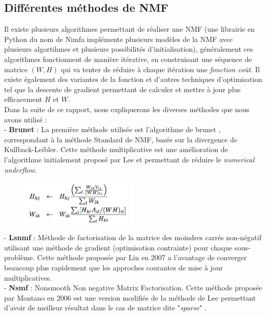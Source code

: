 \documentclass[runningheads]{llncs}
\begin{document}
\subsection{Différentes méthodes de NMF}

Il existe plusieurs algorithmes permettant de réaliser une NMF (une librairie en Python du nom de Nimfa \cite{Zitnik2012} implémente plusieurs modèles de la NMF avec plusieurs algortihmes et plusieurs possibilités d'initialisation), généralement ces algorithmes fonctionnent de manière itérative, en construisant une séquence de matrice $(W, H)$ qui va tenter de réduire à chaque itération une \textit{fonction coût}. Il existe également des variantes de la fonction et d'autres techniques d'optimisation tel que la descente de gradient permettant de calculer et mettre à jour plus efficacement $H$ et $W$. \\
Dans la suite de ce rapport, nous expliquerons les diverses méthodes que nous avons utilisé : \\

 - \textbf{Brunet} : La première méthode utilisée est l'algorithme de brunet \cite{Brunet2004}, correspondant à la méthode Standard de NMF, basée sur la divergence de Kullback-Leibler. Cette méthode multiplicative est une amélioration de l'algorithme initialement proposé par Lee \cite{Lee2001} et permettant de réduire le \textit{numerical underflow}. \\

\begin{figure}[H]
\centering
\includegraphics[width=0.5\textwidth]{brunet.png}
\label{fig:brunet}
\end{figure}

 - \textbf{Lsnmf} : Méthode de factorisation de la matrice des moindres carrés non-négatif utilisant une méthode de gradient (optimisation contrainte) pour chaque sous-problème. 
 Cette méthode proposée par Lin en 2007 \cite{Lin2007} a l'avantage de converger beaucoup plus rapidement que les approches courantes de mise à jour multiplicatives. \\

 - \textbf{Nsmf} : Nonsmooth Non negative Matrix Factorisation. Cette méthode proposée par Montano en 2006 est une version modifiée de la méthode de Lee permettant d'avoir de meilleur résultat dans le cas de matrice dite "\textit{sparse}" \cite{Boutsidis2007}. \\
\end{document}
